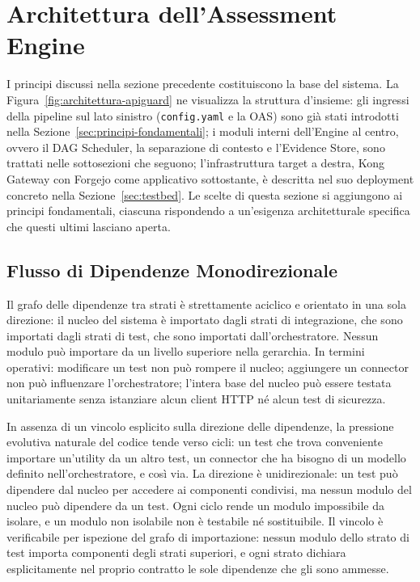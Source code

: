 \section{Architettura dell'Assessment Engine}\label{sec:architettura}

I principi discussi nella sezione precedente costituiscono la base del sistema. La Figura~\ref{fig:architettura-apiguard} ne visualizza la struttura d'insieme: gli ingressi della pipeline sul lato sinistro (\texttt{config.yaml} e la \gls{OAS}) sono già stati introdotti nella Sezione~\ref{sec:principi-fondamentali}; i moduli interni dell'Engine al centro, ovvero il DAG Scheduler, la separazione di contesto e l'Evidence Store, sono trattati nelle sottosezioni che seguono; l'infrastruttura target a destra, Kong Gateway con Forgejo come applicativo sottostante, è descritta nel suo deployment concreto nella Sezione~\ref{sec:testbed}.
Le scelte di questa sezione si aggiungono ai principi fondamentali, ciascuna rispondendo a un'esigenza architetturale specifica che questi ultimi lasciano aperta.




\subsection{Flusso di Dipendenze Monodirezionale}\label{subsec:dep-flow}

Il grafo delle dipendenze tra strati è strettamente aciclico e orientato in una sola direzione: il nucleo del sistema è importato dagli strati di integrazione, che sono importati dagli strati di test, che sono importati dall'orchestratore. Nessun modulo può importare da un livello superiore nella gerarchia. In termini operativi: modificare un test non può rompere il nucleo; aggiungere un connector non può influenzare l'orchestratore; l'intera base del nucleo può essere testata unitariamente senza istanziare alcun client \gls{HTTP} né alcun test di sicurezza.

In assenza di un vincolo esplicito sulla direzione delle dipendenze, la pressione evolutiva naturale del codice tende verso cicli: un test che trova conveniente importare un'utility da un altro test, un connector che ha bisogno di un modello definito nell'orchestratore, e così via. La direzione è unidirezionale: un test può dipendere dal nucleo per accedere ai componenti condivisi, ma nessun modulo del nucleo può dipendere da un test. Ogni ciclo rende un modulo impossibile da isolare, e un modulo non isolabile non è testabile né sostituibile. Il vincolo è verificabile per ispezione del grafo di importazione: nessun modulo dello strato di test importa componenti degli strati superiori, e ogni strato dichiara esplicitamente nel proprio contratto le sole dipendenze che gli sono ammesse.

